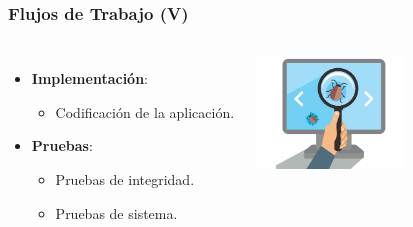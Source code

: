 \documentclass[usenames,dvipsnames]{beamer}
\begin{document}
\begin{frame}
\frametitle{Flujos de Trabajo (V)}
\begin{columns}[c] %

\begin{itemize}
\item \textbf{Implementación}:
	\begin{itemize}
		\item Codificación de la aplicación.
	\end{itemize}
\vspace{0.5cm}
\item \textbf{Pruebas}:
	\begin{itemize}
		\item Pruebas de integridad.
		\item Pruebas de sistema.
	\end{itemize}
\end{itemize}

\vspace{-3cm}
\includegraphics[height=3cm, angle=0]{./img/testing.png}
\end{columns}
\end{frame}
\end{document}
